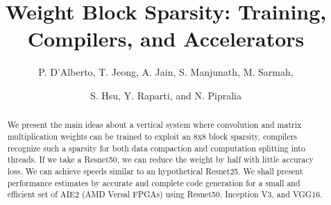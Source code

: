 \documentclass[sigconf]{acmart}
\begin{document}
\title{Weight Block Sparsity: Training, Compilers, and Accelerators}

\author{P. D'\!Alberto,  T. Jeong, A. Jain, S. Manjunath, M. Sarmah, }
\author{S. Hsu, Y. Raparti, and  N. Pipralia}

\renewcommand{\shortauthors}{ D'\!Alberto et al.}

\begin{abstract}
We present the main ideas about a vertical system where convolution
and matrix multiplication weights can be trained to exploit an 8x8
block sparsity, compilers recognize such a sparsity for both data
compaction and computation splitting into threads. If we take a
Resnet50, we can reduce the weight by half with little accuracy
loss. We can achieve speeds similar to an hypothetical Resnet25. We
shall present performance estimates by accurate and complete code
generation for a small and efficient set of AIE2 (AMD Versal FPGAs)
using Resnet50, Inception V3, and VGG16.
\end{abstract}




\maketitle
\end{document}
